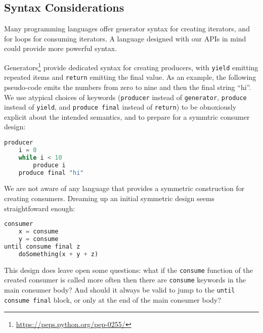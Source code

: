 \documentclass[sigplan,screen,10pt,review]{acmart}
\begin{document}

\subsection{Syntax Considerations}\label{syntax}

Many programming languages offer generator syntax for creating iterators, and for loops for consuming iterators. A language designed with our APIs in mind could provide more powerful syntax.

Generators\footnote{\url{https://peps.python.org/pep-0255/}} provide dedicated syntax for creating producers, with \texttt{yield} emitting repeated items and \texttt{return} emitting the final value. As an example, the following pseudo-code emits the numbers from zero to nine and then the final string ``hi''. We use atypical choices of keywords (\texttt{producer} instead of \texttt{generator}, \texttt{produce} instead of \texttt{yield}, and \texttt{produce final} instead of \texttt{return}) to be obnoxiously explicit about the intended semantics, and to prepare for a symmtric consumer design:

\begin{lstlisting}[language=Python]
producer
    i = 0
    while i < 10
        produce i
    produce final "hi"
\end{lstlisting}

We are not aware of any language that provides a symmetric construction for creating consumers. Dreaming up an initial symmetric design seems straightfoward enough:

\begin{lstlisting}[language=Python]
consumer
    x = consume
    y = consume
until consume final z
    doSomething(x + y + z)
\end{lstlisting}

This design does leave open some questions: what if the \texttt{consume} function of the created consumer is called more often then there are \texttt{consume} keywords in the main consumer body? And should it always be valid to jump to the \texttt{until consume final} block, or only at the end of the main consumer body?
\end{document}
